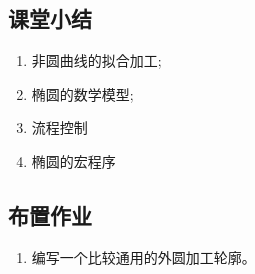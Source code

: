 \subsection{课堂小结}
\begin{enumerate}[1、]
	\item 非圆曲线的拟合加工;
	\item 椭圆的数学模型;
	\item 流程控制
	\item 椭圆的宏程序
\end{enumerate}

\vfill
\subsection{布置作业}
\begin{enumerate}[1、]
	\item 编写一个比较通用的外圆加工轮廓。 
\end{enumerate}
\vfill